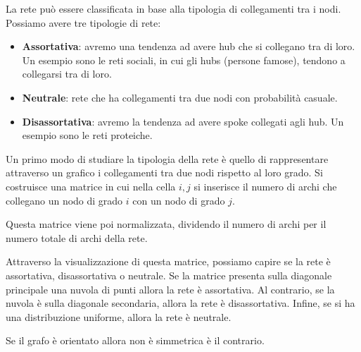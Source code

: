 La rete può essere classificata in base alla tipologia di collegamenti tra i nodi.
Possiamo avere tre tipologie di rete:
\begin{itemize}
    \item \textbf{Assortativa}: avremo una tendenza ad avere hub che si collegano
          tra di loro. Un esempio sono le reti sociali, in cui gli hubs (persone
          famose), tendono a collegarsi tra di loro.
    \item \textbf{Neutrale}: rete che ha collegamenti tra due nodi con probabilità
          casuale.
    \item \textbf{Disassortativa}: avremo la tendenza ad avere spoke collegati
          agli hub. Un esempio sono le reti proteiche.
\end{itemize}
Un primo modo di studiare la tipologia della rete è quello di rappresentare
attraverso un grafico i collegamenti tra due nodi rispetto al loro grado. Si
costruisce una matrice in cui nella cella $i, j$ si inserisce il numero di archi
che collegano un nodo di grado $i$ con un nodo di grado $j$.

Questa matrice viene poi normalizzata, dividendo il numero di archi per il numero
totale di archi della rete.

Attraverso la visualizzazione di questa matrice, possiamo capire se la rete è
assortativa, disassortativa o neutrale. Se la matrice presenta sulla diagonale
principale una nuvola di punti allora la rete è assortativa. Al contrario, se
la nuvola è sulla diagonale secondaria, allora la rete è disassortativa. Infine,
se si ha una distribuzione uniforme, allora la rete è neutrale.
\begin{nota}
    Se il grafo è orientato allora non è simmetrica è il contrario.
\end{nota}


